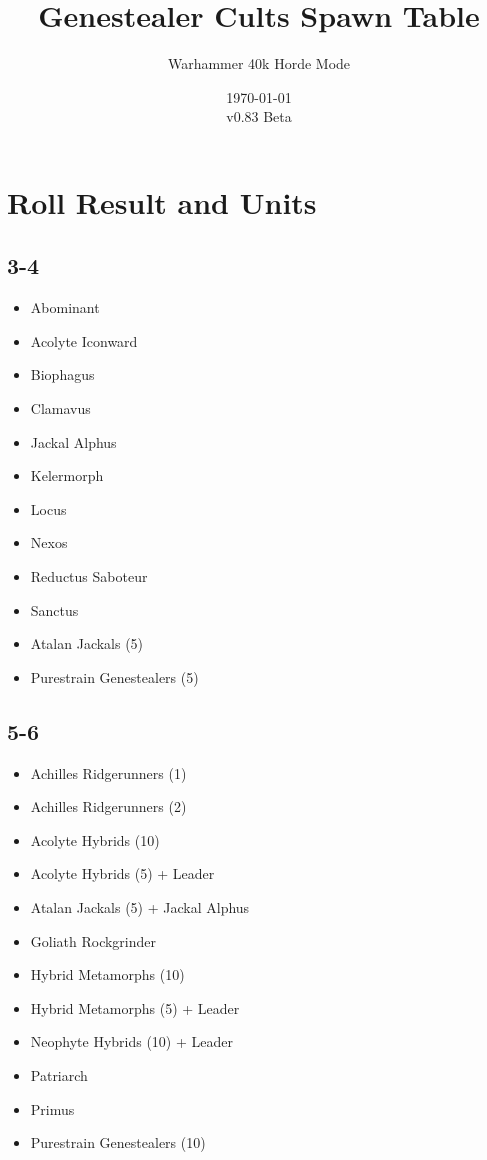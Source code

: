 \documentclass{HordeModeTarot}
\title{Genestealer Cults Spawn Table}
\author{Warhammer 40k Horde Mode}
\date{\today \\v0.83 Beta}
\begin{document}
\maketitle

\outputUsingSpawnTableBoilerplate
\section{Roll Result and Units}\hypertarget{roll-results}{}\label{roll-results}

\begin{multicols}{2}

\subsection*{3-4}

\begin{itemize}[leftmargin=*]
\item[] Abominant
\item[] Acolyte Iconward
\item[] Biophagus
\item[] Clamavus
\item[] Jackal Alphus
\item[] Kelermorph
\item[] Locus
\item[] Nexos
\item[] Reductus Saboteur
\item[] Sanctus
\item[] Atalan Jackals (5)
\item[] Purestrain Genestealers (5)
\end{itemize}

\subsection*{5-6}

\begin{itemize}[leftmargin=*]
\item[] Achilles Ridgerunners (1)
\item[] Achilles Ridgerunners (2)
\item[] Acolyte Hybrids (10)
\item[] Acolyte Hybrids (5) + Leader
\item[] Atalan Jackals (5) + Jackal Alphus
\item[] Goliath Rockgrinder
\item[] Hybrid Metamorphs (10)
\item[] Hybrid Metamorphs (5) + Leader
\item[] Neophyte Hybrids (10) + Leader
\item[] Patriarch
\item[] Primus
\item[] Purestrain Genestealers (10)
\end{itemize}


\end{multicols}
\end{document}
